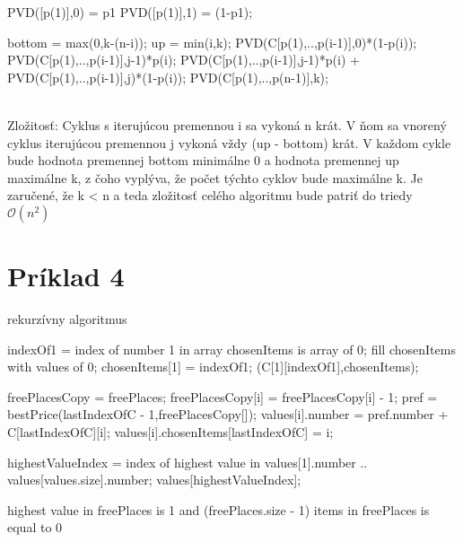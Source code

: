 \documentclass[paper=a4, fontsize=11pt]{scrartcl} %
\numberwithin{equation}{section} %
\numberwithin{figure}{section} %
\numberwithin{table}{section} %
\begin{document}
\begin{algorithmic}[1]
		\State PVD([p(1)],0) = p1
		\State PVD([p(1)],1) = (1-p1);

			\State bottom = max(0,k-(n-i));
			\State up = min(i,k);
					\State PVD(C[p(1),..,p(i-1)],0)*(1-p(i));
				\Else {}
					\State PVD(C[p(1),..,p(i-1)],j-1)*p(i);
				\Else 
					\State PVD(C[p(1),..,p(i-1)],j-1)*p(i) + PVD(C[p(1),..,p(i-1)],j)*(1-p(i));
				\EndIf \EndIf
			\EndFor
		\EndFor
		\State \Return PVD(C[p(1),..,p(n-1)],k);
	\EndFunction
\end{algorithmic}
\ \\
Zložitosť:
Cyklus s iterujúcou premennou i sa vykoná n krát.
V ňom sa vnorený cyklus iterujúcou premennou j vykoná vždy (up - bottom) krát.
V každom cykle bude hodnota premennej bottom minimálne 0 a hodnota premennej up maximálne k, z čoho vyplýva, že počet týchto cyklov bude maximálne k.
Je zaručené, že k < n a teda zložitosť celého algoritmu bude patriť do triedy $\mathcal{O}(n^2)$


\pagebreak


\section*{Príklad 4}

rekurzívny algoritmus

\begin{algorithmic}[1]
        \State indexOf1 = index of number 1 in array
	\State chosenItems is array of 0;
	\State fill chosenItems with values of 0;
	\State chosenItems[1] = indexOf1;
	\State \Return (C[1][indexOf1],chosenItems);
    \EndIf


            \State freePlacesCopy = freePlaces;			
            \State	freePlacesCopy[i] = freePlacesCopy[i] - 1;			
            \State	pref = bestPrice(lastIndexOfC - 1,freePlacesCopy[]);			
            \State	values[i].number = pref.number + C[lastIndexOfC][i]; 
	    \State	values[i].chosenItems[lastIndexOfC] = i;
        \EndIf
    \EndFor
	
    \State highestValueIndex = index of highest value in values[1].number .. values[values.size].number;
    \State \Return values[highestValueIndex];
\EndFunction

    \State \Return highest value in freePlaces is 1 and (freePlaces.size - 1) items in freePlaces is equal to 0
\EndFunction
\end{algorithmic}
\end{document}
